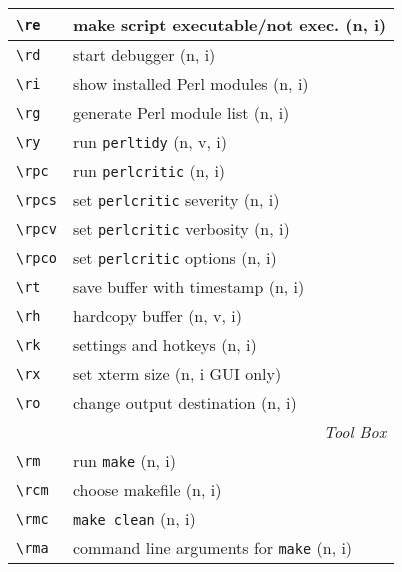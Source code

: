 \documentclass[oneside,10pt,landscape,DIV17]{scrartcl}
\begin{document}
\begin{multicols}{2}
\begin{tabular}[]{|p{11mm}|p{61mm}|}
\hline \verb'\re'    & make script executable/not exec.         \hfill (n, i)   \\
\hline \verb'\rd'    & start debugger                           \hfill (n, i)   \\
\hline \verb'\ri'    & show installed Perl modules              \hfill (n, i)   \\
\hline \verb'\rg'    & generate Perl module list                \hfill (n, i)   \\
\hline \verb'\ry'    & run \verb'perltidy'                      \hfill (n, v, i)\\
\hline \verb'\rpc'   & run \verb'perlcritic'                    \hfill (n, i)   \\
\hline \verb'\rpcs'  & set \verb'perlcritic' severity           \hfill (n, i)   \\
\hline \verb'\rpcv'  & set \verb'perlcritic' verbosity          \hfill (n, i)   \\
\hline \verb'\rpco'  & set \verb'perlcritic' options            \hfill (n, i)   \\
\hline \verb'\rt'    & save buffer with timestamp               \hfill (n, i)   \\
\hline \verb'\rh'    & hardcopy buffer                          \hfill (n, v, i)\\
\hline \verb'\rk'    & settings and hotkeys                     \hfill (n, i)   \\
\hline \verb'\rx'    & set xterm size                           \hfill (n, i {\tiny GUI only})\\
\hline \verb'\ro'    & change output destination                \hfill (n, i)   \\
\hline
\hline
\multicolumn{2}{|r|}{\textsl{Tool Box}} \\[1.0ex]
\hline \verb'\rm'    & run \texttt{make}                        \hfill (n, i)   \\
\hline \verb'\rcm'   & choose makefile                          \hfill (n, i)   \\
\hline \verb'\rmc'   & \texttt{make clean}                      \hfill (n, i)   \\
\hline \verb'\rma'   & command line arguments for \texttt{make} \hfill (n, i)   \\
\hline
\end{tabular}%
%


\end{multicols}
\end{document}
